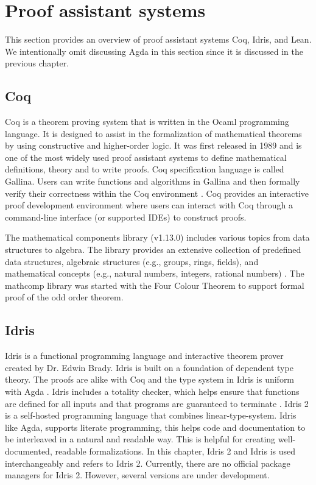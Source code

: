 \section{Proof assistant systems}
\label{Proof_system}
This section provides an overview of proof assistant systems Coq, Idris, and
Lean. We intentionally omit discussing Agda in this section since it is
discussed in the previous chapter. 

\subsection{Coq}
Coq \cite{Paulin-Mohring2012} is a theorem proving system that is written in the
Ocaml programming language. It is designed to assist in the formalization of
mathematical theorems by using constructive and higher-order logic.  It was
first released in 1989 and is one of the most widely used proof assistant
systems to define mathematical definitions, theory and to write proofs. Coq
specification language is called Gallina. Users can write functions and
algorithms in Gallina and then formally verify their correctness within the Coq
environment \cite{bertot2013interactive}. Coq provides an interactive proof
development environment where users can interact with Coq through a command-line
interface (or supported IDEs) to construct proofs.

The mathematical components library (v1.13.0) \cite{assia_mahboubi_2021_4457887}
includes various topics from data structures to algebra. The library provides an
extensive collection of predefined data structures, algebraic structures (e.g.,
groups, rings, fields), and mathematical concepts (e.g., natural numbers,
integers, rational numbers) \cite{2019arXiv191203028S}. The mathcomp library was
started with the Four Colour Theorem to support formal proof of the odd order
theorem. 

\subsection{Idris}
Idris is a functional programming language and interactive theorem prover
created by Dr. Edwin Brady. Idris is built on a foundation of dependent type
theory. The proofs are alike with Coq and the type system in Idris is uniform
with Agda \cite{brady2022idris}. Idris includes a totality checker, which helps
ensure that functions are defined for all inputs and that programs are
guaranteed to terminate \cite{brady2013idris}. Idris 2 is a self-hosted
programming language that combines linear-type-system. Idris like Agda, supports
literate programming, this helps code and documentation to be interleaved in a
natural and readable way. This is helpful for creating well-documented, readable
formalizations. In this chapter, Idris 2 and Idris is used interchangeably and
refers to Idris 2. Currently, there are no official package managers for Idris
2. However, several versions are under development. 

